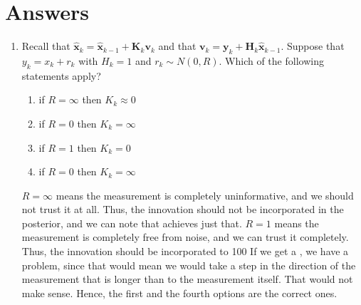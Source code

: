 \section{Answers}

\begin{enumerate}
\item Recall that $\hat{\mathbf{x}}_k = \hat{\mathbf{x}}_{k-1} + \mathbf{K}_k\mathbf{v}_k$ and that $\mathbf{v}_k = \mathbf{y}_{k} + \mathbf{H}_k\hat{\mathbf{x}}_{k-1}$. Suppose that 
$y_k = x_k + r_k$ with $H_k = 1$ and $r_k \sim N(0,R)$. Which of the following statements apply?

\begin{enumerate}
\item if $R=\infty$ then $K_k \approx 0$
\item if $R=0$ then $K_k = \infty$
\item if $R=1$ then $K_k = 0$
\item if $R=0$ then $K_k = \infty$
\end{enumerate}

$R = \infty$  means the measurement is completely uninformative, and we should not trust it at all. Thus,
 the innovation should not be incorporated in the posterior, and we can note that achieves just that.
$R = 1 $ means the measurement is completely free from noise, and we can trust it completely. 
Thus, the innovation should be incorporated to 100%
If we get a , we have a problem, since that would mean we would take a step in the direction of 
the measurement that is longer than to the measurement itself. That would not make sense. Hence,  the first and the fourth options are the correct ones. 
\end{enumerate}



